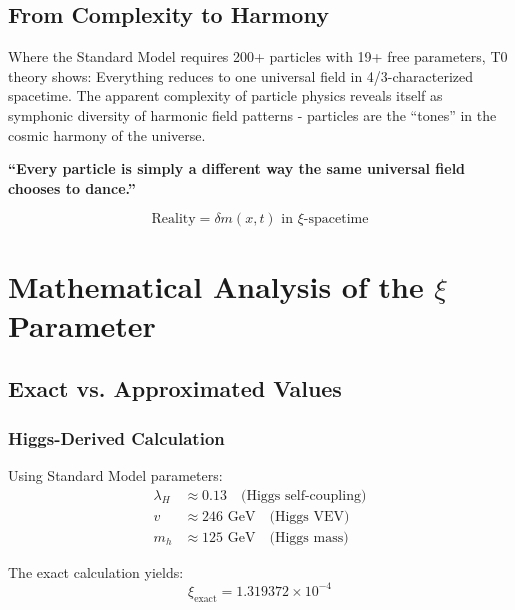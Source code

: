 	\subsection{From Complexity to Harmony}
	\label{subsec:from-complexity-to-harmony}
	
	Where the Standard Model requires 200+ particles with 19+ free parameters, T0 theory shows: Everything reduces to one universal field in 4/3-characterized spacetime. The apparent complexity of particle physics reveals itself as symphonic diversity of harmonic field patterns - particles are the ``tones'' in the cosmic harmony of the universe.
	
	\begin{tcolorbox}[colback=blue!5!white,colframe=blue!75!black,title=Central T0 Principle,breakable]
		\textbf{``Every particle is simply a different way the same universal field chooses to dance.''}
		
		\begin{equation}
			\boxed{\text{Reality} = \delta m(x,t) \text{ in } \xi \text{-spacetime}}
			\label{eq:fundamental_reality}
		\end{equation}
	\end{tcolorbox}
	
	\section{Mathematical Analysis of the \texorpdfstring{$\xi$}{xi} Parameter}
	\label{sec:xi_analysis}
	
	\subsection{Exact vs. Approximated Values}
	\label{subsec:exact_vs_approximated}
	
	\subsubsection{Higgs-Derived Calculation}
	\label{subsubsec:higgs_calculation}
	
	Using Standard Model parameters:
	\begin{align}
		\lambda_H &\approx 0.13 \quad \text{(Higgs self-coupling)} \\
		v &\approx 246 \text{ GeV} \quad \text{(Higgs VEV)} \\
		m_h &\approx 125 \text{ GeV} \quad \text{(Higgs mass)}
	\end{align}
	
	The exact calculation yields:
	\begin{equation}
		\xi_{\text{exact}} = 1.319372 \times 10^{-4}
		\label{eq:xi_exact}
	\end{equation}
	

